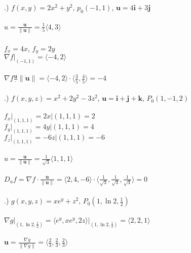 \documentclass[12pt]{article}
\begin{document}
.) $f(x,y) = 2x^{2} + y^{2}$, \hspace{10pt} $p_{0}(-1,1)$, \hspace{10pt} $\mathbf{u} = 4\mathbf{i} + 3\mathbf{j}$\\\\
\noindent $\hat{u} = \frac{\mathbf{u}}{\| \mathbf{u} \|} = \frac{1}{5} \langle 4, 3\rangle$\\\\
\noindent $f_{x} = 4x$, \hspace{10pt} $f_{y} = 2y$\\
\noindent $\nabla f \Big|_{(-1, 1)} = \langle -4, 2\rangle$\\\\
\noindent $\nabla f \frac{\mathbf{u}}\cdot {\| \mathbf{u} \|} = \langle -4, 2\rangle \cdot \langle \frac{3}{5} , \frac{4}{5}\rangle = -4$\\\\
.) $f(x, y, z) = x^{2} + 2y^{2} - 3z^{2}$, \hspace{10pt} $\mathbf{u} = \mathbf{i} + \mathbf{j} + \mathbf{k}$, \hspace{10pt} $P_{0}(1, -1, 2)$\\\\
\noindent $f_{x} \Big|_{(1, 1, 1)} = 2x \Big|{(1, 1, 1)} = 2$\\
\noindent $f_{y} \Big|_{(1, 1, 1)} = 4y \Big|{(1, 1, 1)} = 4$\\
\noindent $f_{z} \Big|_{(1, 1, 1)} = -6z \Big|{(1, 1, 1)} = -6$\\\\
\noindent $\hat{u} =\frac{\mathbf{u}} {\| \mathbf{u} \| } = \frac{1}{\sqrt{3}} \langle 1, 1, 1 \rangle$\\\\
\noindent $D_{u}f = \nabla f \cdot \frac{\mathbf{u}}{\| \mathbf{u} \|} = \langle 2, 4, -6\rangle \cdot \langle\frac{1}{\sqrt{3}}, \frac{1}{\sqrt{3}}, \frac{1}{\sqrt{3}} \rangle = 0$\\\\
.) $g(x,y,z) = xe^{y} + z^{2}$, \hspace{10pt} $P_{0}(1,\ln{2}, \frac{1}{2})$\\\\
\noindent $\nabla g \Big|_{(1, \ln{2}, \frac{1}{2})} = \langle e^{y}, xe^{y}, 2z \rangle \Big|_{(1, \ln{2}, \frac{1}{2})} = \langle 2, 2, 1\rangle$\\\\
\noindent $\mathbf{u} = \frac{\nabla g}{\| \nabla g \|} = \langle \frac{2}{3}, \frac{2}{3}, \frac{2}{3}\rangle$\\\\
\end{document}
